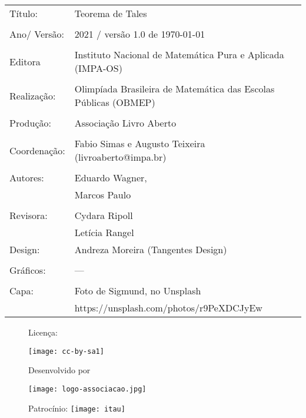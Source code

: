 \begin{tabular}{p{}p{}}
Título: & Teorema de Tales\\
\\
Ano/ Versão: & 2021 / versão 1.0 de \today\\
\\
Editora & Instituto Nacional de Matem\'atica Pura e Aplicada (IMPA-OS)\\
\\
Realização:& Olimp\'iada Brasileira de Matem\'atica das Escolas P\'ublicas (OBMEP)\\
\\
Produção:& Associação Livro Aberto\\
\\
Coordenação: & Fabio Simas e Augusto Teixeira (livroaberto@impa.br)\\
\\
  Autores: & Eduardo Wagner,\\
        & Marcos Paulo\\
\\
Revisora: &  Cydara Ripoll  \\
          &  Letícia Rangel
\\
Design: & Andreza Moreira (Tangentes Design) \\
\\
Gráficos: & --- \\
\\
  Capa: & Foto de Sigmund, no Unsplash \\
        & https://unsplash.com/photos/r9PeXDCJyEw \\

\end{tabular}

\begin{figure}[b]
\begin{minipage}[l]{5cm}
\centering

{\large Licença:}

  \texttt{[image: cc-by-sa1]}
\end{minipage}\hfill
\begin{minipage}[c]{5cm}
\centering
{\large Desenvolvido por}

\texttt{[image: logo-associacao.jpg]}
\end{minipage}
\begin{minipage}[r]{5cm}
\centering

{\large Patrocínio:}
  \vspace{1em}
  \texttt{[image: itau]}
\end{minipage}
\end{figure}


